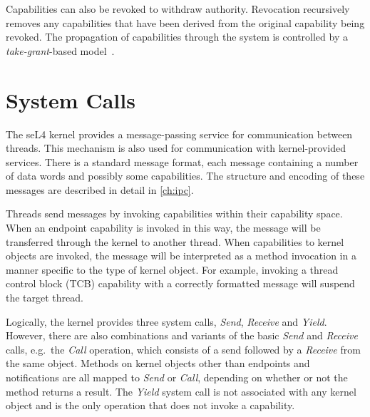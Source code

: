 Capabilities can also be revoked to withdraw
authority. Revocation recursively removes any capabilities that have
been derived from the original capability being revoked. The propagation of
capabilities through the system is controlled by a
\emph{take-grant}-based model~\cite{Elkaduwe_GE_08,Boyton_09}.

\section{System Calls}
\label{sec:syscalls}
\label{sec:sys_send}
\label{sec:sys_recv}
\label{sec:sys_call}
\label{sec:sys_reply}
\label{sec:sys_nbsend}
\label{sec:sys_replyrecv}
\label{sec:sys_nbrecv}
\label{sec:sys_yield}

The seL4 kernel provides a message-passing service for communication between
threads. This mechanism is also used for communication with kernel-provided
services. There is a standard message format, each message containing a
number of data words and possibly some capabilities. The structure and encoding
of these messages are described in detail in \autoref{ch:ipc}. 

Threads send messages by invoking capabilities within their capability space.
When an endpoint capability is invoked in this way, the message will be
transferred through the kernel to another thread. When capabilities to kernel
objects are invoked, the message will be interpreted as a method invocation in a
manner specific to the type of kernel object. For example, invoking a thread
control block (TCB) capability with a correctly formatted message will suspend
the target thread.

Logically, the kernel provides three system calls, \emph{Send},
\emph{Receive} and \emph{Yield}. However, there are also combinations
and variants of the basic \emph{Send} and \emph{Receive} calls, e.g.\
the \emph{Call} operation, which consists of a send followed by a
\emph{Receive} from the same object. Methods on kernel objects other
than endpoints and notifications are all mapped to \emph{Send} or
\emph{Call}, depending on whether or not the method returns a
result. The \emph{Yield} system call is not associated with any kernel
object and is the only operation that does not invoke a capability.

